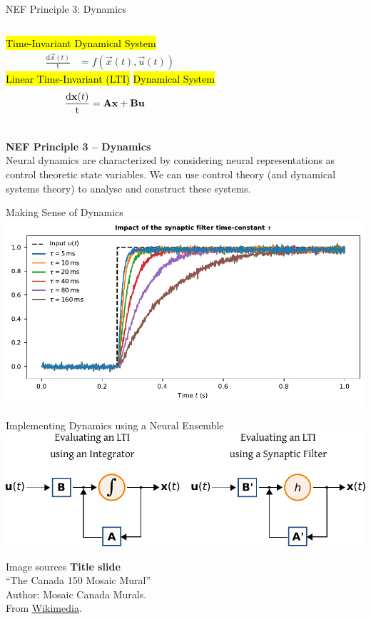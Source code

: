 \documentclass[handout,aspectratio=169]{beamer}
\begin{document}
	\begin{frame}{NEF Principle 3: Dynamics}
		\begin{columns}[b]
				\centering
				\hl{Time-Invariant Dynamical System}\\
				\begin{align*}
					\frac{\mathrm{d}\vec x(t)}{\mathrm{t}} &= f(\vec x(t), \vec u(t))
				\end{align*}
				\centering
				\hl{Linear Time-Invariant (LTI)}
				\hl{Dynamical System}
				\begin{align*}
					\frac{\mathrm{d}{\mathbf{x}}(t)}{\mathrm{t}} &= {\mathbf{A}} {\mathbf{x}} + {\mathbf{B}} {\mathbf{u}}
				\end{align*}
		\end{columns}
		\vspace{0.75cm}
		\begin{mdframed}
			\textbf{NEF Principle 3 -- Dynamics}\\
			Neural dynamics are characterized by considering neural representations as control theoretic state variables. We can use control theory (and dynamical systems theory) to analyse and construct these systems.
		\end{mdframed}
	\end{frame}

	\begin{frame}{Making Sense of Dynamics}
		\centering
		\includegraphics[width=\textwidth]{media/synaptic_filter.pdf} 		
	\end{frame}

	\begin{frame}{Implementing Dynamics using a Neural Ensemble}
		\centering
		\includegraphics[width=\textwidth]{media/lti_integrator_vs_neural.pdf} 
	\end{frame}

	\backupbegin
	
	\begin{frame}[noframenumbering]{Image sources}
		\small
		\textbf{Title slide}\\\enquote{The Canada 150 Mosaic Mural}\\Author: Mosaic Canada Murals.\\From \href{https://commons.wikimedia.org/wiki/File:Canada_150_Mosaic_Engine.jpg}{Wikimedia}.
	\end{frame}


	\backupend
	
\end{document}
